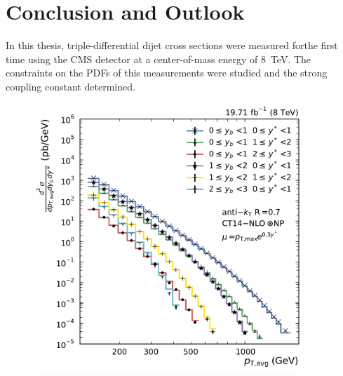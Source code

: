 
\chapter{Conclusion and Outlook}

In this thesis, triple-differential dijet cross sections were measured forthe
first time using the CMS detector at a center-of-mass energy of \SI{8}{\TeV}.
The constraints on the PDFs of this measurements were studied and the strong
coupling constant \asmz determined.


\begin{figure}[h!tbp]
    \centering
    \includegraphics[width=0.9\textwidth]{figures/measurement/ptavg_spectrum.pdf}\hfill
    \caption[asdf]{}
    \label{fig:measurement_result}
\end{figure}
